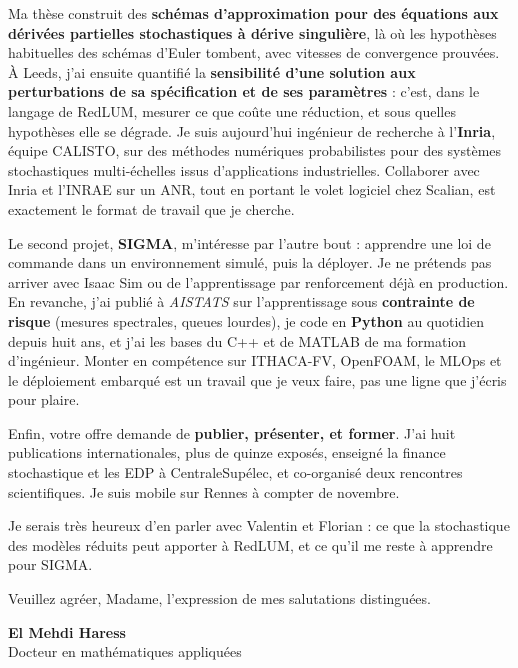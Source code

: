 \documentclass[10pt,a4paper]{article}
\newcommand{\cpp}{\mbox{C++}}
\begin{document}
Ma thèse construit des \textbf{schémas d'approximation pour des équations aux dérivées partielles
stochastiques à dérive singulière}, là où les hypothèses habituelles des schémas d'Euler tombent, avec
vitesses de convergence prouvées. À Leeds, j'ai ensuite quantifié la \textbf{sensibilité d'une solution aux
perturbations de sa spécification et de ses paramètres} : c'est, dans le langage de RedLUM, mesurer ce que
coûte une réduction, et sous quelles hypothèses elle se dégrade. Je suis aujourd'hui ingénieur de recherche à
l'\textbf{Inria}, équipe CALISTO, sur des méthodes numériques probabilistes pour des systèmes stochastiques
multi-échelles issus d'applications industrielles. Collaborer avec Inria et l'INRAE sur un ANR, tout en
portant le volet logiciel chez Scalian, est exactement le format de travail que je cherche.

Le second projet, \textbf{SIGMA}, m'intéresse par l'autre bout : apprendre une loi de commande dans un
environnement simulé, puis la déployer. Je ne prétends pas arriver avec Isaac Sim ou de l'apprentissage par
renforcement déjà en production. En revanche, j'ai publié à \emph{AISTATS} sur l'apprentissage sous
\textbf{contrainte de risque} (mesures spectrales, queues lourdes), je code en \textbf{Python} au quotidien
depuis huit ans, et j'ai les bases du \cpp{} et de MATLAB de ma formation d'ingénieur. Monter en compétence
sur ITHACA-FV, OpenFOAM, le MLOps et le déploiement embarqué est un travail que je veux faire, pas une
ligne que j'écris pour plaire.

Enfin, votre offre demande de \textbf{publier, présenter, et former}. J'ai huit publications internationales,
plus de quinze exposés, enseigné la finance stochastique et les EDP à CentraleSupélec, et co-organisé deux
rencontres scientifiques. Je suis mobile sur Rennes à compter de novembre.

Je serais très heureux d'en parler avec Valentin et Florian : ce que la stochastique des modèles réduits
peut apporter à RedLUM, et ce qu'il me reste à apprendre pour SIGMA.

Veuillez agréer, Madame, l'expression de mes salutations distinguées.

\vspace{2.2ex}

\hfill
\begin{minipage}{0.42\textwidth}
\raggedleft
{\headingfont\bfseries\small El Mehdi Haress}\\[0.2ex]
{\small\color{muted}Docteur en mathématiques appliquées}
\end{minipage}
\end{document}
